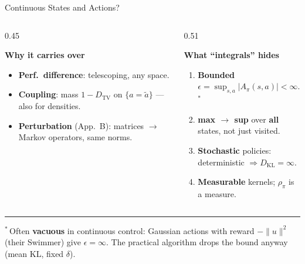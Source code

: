 \documentclass[aspectratio=169]{beamer}
\newcommand{\DKL}{D_{\mathrm{KL}}}
\newcommand{\DTV}{D_{\mathrm{TV}}}
\begin{document}
\begin{frame}[label=trpo-continuous]{Continuous States and Actions?}
  \vspace{4pt}
  \begin{columns}[t]
    \begin{column}{0.45\textwidth}
      {\bfseries\color{AtlasAccent}Why it carries over\par}
      \small
      \begin{itemize}
        \item \textbf{Perf.\ difference}: telescoping, any space.
        \item \textbf{Coupling}: mass $1-\DTV$ on $\{a=\tilde a\}$ --- also for densities.
        \item \textbf{Perturbation} (App.~B): matrices $\to$ Markov operators, same norms.
      \end{itemize}
    \end{column}
    \begin{column}{0.51\textwidth}
      {\bfseries\color{AtlasAccent}What ``integrals'' hides\par}
      \small
      \begin{enumerate}
        \item \textbf{Bounded} $\epsilon = \sup_{s,a}|A_\pi(s,a)| < \infty$.$^{\ast}$
        \item \textbf{max $\to$ sup} over \textbf{all} states, not just visited.
        \item \textbf{Stochastic} policies: deterministic $\Rightarrow \DKL = \infty$.
        \item \textbf{Measurable} kernels; $\rho_\pi$ is a measure.
      \end{enumerate}
    \end{column}
  \end{columns}
  \vfill
  {\color{NoteGray}\rule{0.3\linewidth}{0.4pt}\par}
  {\scriptsize\color{NoteGray}$^{\ast}$\,Often \textbf{vacuous} in continuous control: Gaussian actions with reward $-\|u\|^2$ (their Swimmer) give $\epsilon = \infty$.
  The practical algorithm drops the bound anyway (mean KL, fixed $\delta$).\par}
  \hfill \hyperlink{trpo-thm1}{}

\end{frame}
\end{document}
